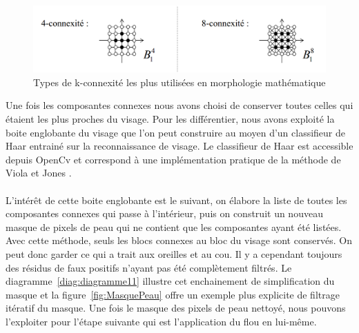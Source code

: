 \documentclass[11pt, french,screen]{report-rd-info}
\begin{document}
\begin{figure}
\centering
\includegraphics[scale=0.5]{Images/connexite}
\caption{Types de k-connexité les plus utilisées en morphologie mathématique}
\label{diag:connexite}
\end{figure}


Une fois les composantes connexes nous avons choisi de conserver toutes celles qui étaient les plus proches du visage. Pour les différentier, nous avons exploité la boite englobante du visage que l'on peut construire au moyen d'un classifieur de Haar entrainé sur la reconnaissance de visage. Le classifieur de Haar est accessible depuis OpenCv et correspond à une implémentation pratique de la méthode de Viola et Jones \cite{Viola2004}.

\paragraph*{}
L'intérêt de cette boite englobante est le suivant, on élabore la liste de toutes les composantes connexes qui passe à l'intérieur, puis on construit un nouveau masque de pixels de peau qui ne contient que les composantes ayant été listées. Avec cette méthode, seuls les blocs connexes au bloc du visage sont conservés. On peut donc garder ce qui a trait aux oreilles et au cou. Il y a cependant toujours des résidus de faux positifs n'ayant pas été complètement filtrés. Le diagramme~\ref{diag:diagramme11} illustre cet enchainement de simplification du masque et la figure~\ref{fig:MasquePeau} offre un exemple plus explicite de filtrage itératif du masque. Une fois le masque des pixels de peau nettoyé, nous pouvons l'exploiter pour l'étape suivante qui est l'application du flou en lui-même.
\end{document}
